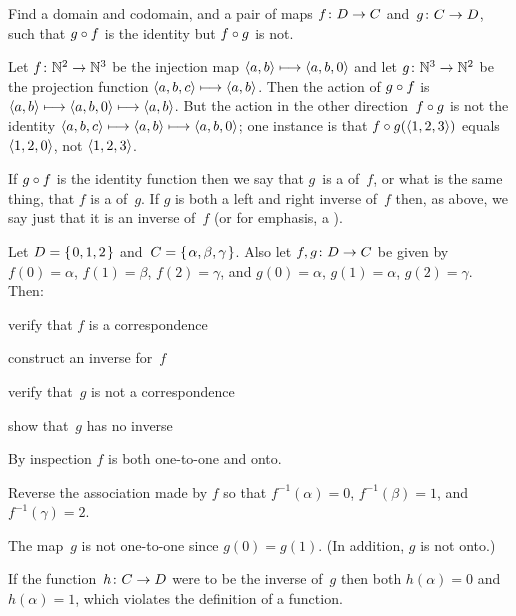 \documentclass{ibl}  %
\begin{document}
\begin{ex}
  Find a domain and codomain, and a pair of maps $\mbox{$f\colon D\to C$}$ 
  and~$\mbox{$g\colon C\to D$}$,
  such that $g\mathbin{\circ} f$ is the identity but $f\mathbin{\circ} g$
  is not.
\begin{ans}
Let $\mbox{$f\colon \mathbb{N}^2\to \mathbb{N}^3$}$ be the injection map
$\langle a,b\rangle\stackrel{}{\longmapsto}\langle a,b,0\rangle$
and let 
$\mbox{$g\colon \mathbb{N}^3\to \mathbb{N}^2$}$ be the projection function
$\langle a,b,c\rangle\stackrel{}{\longmapsto}\langle a,b\rangle$.
Then the action of $g\mathbin{\circ} f$ is 
$\langle a,b\rangle\stackrel{}{\longmapsto}\langle a,b,0\rangle\stackrel{}{\longmapsto}\langle a,b\rangle$.
But the action in the other direction~$f\mathbin{\circ} g$ is not the identity
$\langle a,b,c\rangle\stackrel{}{\longmapsto}\langle a,b\rangle\stackrel{}{\longmapsto}\langle a,b,0\rangle$;
one instance is that $f\mathbin{\circ} g(\langle1,2,3\rangle)$ equals
$\langle1,2,0\rangle$, not $\langle1,2,3\rangle$.     
\end{ans}
\end{ex}

If $g\mathbin{\circ} f$ is the identity function then we say that 
$g$~is a  of~$f$\!, or what is the
same thing, that $f$ is a  of~$g$.
If $g$ is both a left and right inverse of~$f$ then, 
as above, we say just that it is
an inverse of~$f$ (or for emphasis, a ). 

\begin{ex}
Let $D=\mbox{$\{\hspace{0.1em}0,1,2\hspace{0.1em}\}$}$ and~$C=\mbox{$\{\hspace{0.1em}\alpha,\beta,\gamma\hspace{0.1em}\}$}$.
Also let $\mbox{$f,g\colon D\to C$}$ be given by
$f(0)=\alpha$, $f(1)=\beta$, $f(2)=\gamma$, and
$g(0)=\alpha$, $g(1)=\alpha$, $g(2)=\gamma$.
Then:
\begin{items}
\item verify that $f$ is a correspondence
\item construct an inverse for~$f$\!
\item verify that~$g$ is not a correspondence
\item show that~$g$ has no inverse 
\end{items}
\begin{ans}
\begin{items}
\item By inspection $f$ is both one-to-one and onto.
\item Reverse the association made by $f$ so that $f^{-1}(\alpha)=0$,
  $f^{-1}(\beta)=1$, and~$f^{-1}(\gamma)=2$.
\item The map~$g$ is not one-to-one since $g(0)=g(1)$.
  (In addition, $g$ is not onto.) 
\item If the function~$\mbox{$h\colon C\to D$}$ were to be the inverse of~$g$
  then both $h(\alpha)=0$ and~$h(\alpha)=1$, 
  which violates the definition of a function.   
\end{items}
\end{ans}
\end{ex}
\end{document}
